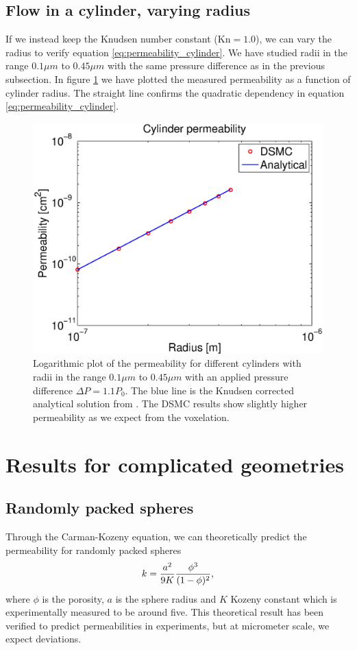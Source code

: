 \subsection{Flow in a cylinder, varying radius}
If we instead keep the Knudsen number constant ($\text{Kn}=1.0$), we can vary the radius to verify equation \eqref{eq:permeability_cylinder}. We have studied radii in the range $0.1 \mu m$ to $0.45 \mu m$ with the same pressure difference as in the previous subsection. In figure \ref{fig:one_cylinder_varying_radii_result} we have plotted the measured permeability as a function of cylinder radius. The straight line confirms the quadratic dependency in equation \eqref{eq:permeability_cylinder}.
\begin{figure}[h]
\begin{center}
\includegraphics[width=\textwidth, trim=0cm 0cm 0cm 0cm, clip]{DSMC/figures/cylinder_radius_permeability.eps}
\end{center}
\caption{Logarithmic plot of the permeability for different cylinders with radii in the range $0.1 \mu m$ to $0.45 \mu m$ with an applied pressure difference $\Delta P = 1.1P_0$. The blue line is the Knudsen corrected analytical solution from \cite{karniadakis2005microflows}. The DSMC results show slightly higher permeability as we expect from the voxelation.}
\label{fig:one_cylinder_varying_radii_result}
\end{figure}
\section{Results for complicated geometries}
\subsection{Randomly packed spheres}
Through the Carman-Kozeny equation, we can theoretically predict the permeability for randomly packed spheres 
\begin{align}
	k = {a^2 \over 9K} {\phi^3 \over (1 - \phi)^2},
\end{align}
where $\phi$ is the porosity, $a$ is the sphere radius and $K$ Kozeny constant which is experimentally measured to be around five\cite{carman1937fluid}. This theoretical result has been verified to predict permeabilities in experiments, but at micrometer scale, we expect deviations. 

